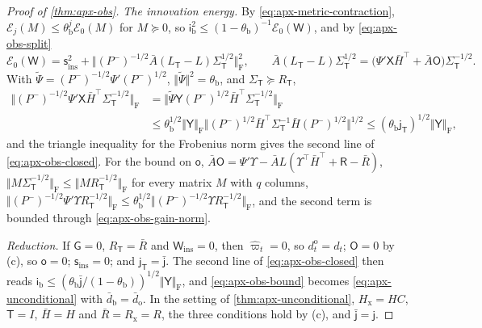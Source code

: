 \begin{proof}[Proof of \cref{thm:apx-obs}]
\emph{The innovation energy.} By \cref{eq:apx-metric-contraction}, $\mathcal E_j(M)\le\theta_{\mathrm b}^j\mathcal E_0(M)$ for $M\succeq0$, so $\mathsf i_{\mathrm b}^2\le(1-\theta_{\mathrm b})^{-1}\mathcal E_0(\mathsf W)$, and by \eqref{eq:apx-obs-split}
\begin{equation*}
\mathcal E_0(\mathsf W)=\mathsf s_{\mathrm{ins}}^2+\bigl\Vert(P^-)^{-1/2}\bar A(L_{\mathsf T}-L)\Sigma_{\mathsf T}^{1/2}\bigr\Vert_{\mathrm F}^2,\qquad\bar A(L_{\mathsf T}-L)\Sigma_{\mathsf T}^{1/2}=\bigl(\Psi'\mathsf X\bar H^\top+\bar A\mathsf O\bigr)\Sigma_{\mathsf T}^{-1/2} .
\end{equation*}
With $\tilde\Psi=(P^-)^{-1/2}\Psi'(P^-)^{1/2}$, $\Vert\tilde\Psi\Vert^2=\theta_{\mathrm b}$, and $\Sigma_{\mathsf T}\succeq R_{\mathsf T}$,
\begin{equation*}
\begin{aligned}
\bigl\Vert(P^-)^{-1/2}\Psi'\mathsf X\bar H^\top\Sigma_{\mathsf T}^{-1/2}\bigr\Vert_{\mathrm F}&=\bigl\Vert\tilde\Psi\mathsf Y(P^-)^{1/2}\bar H^\top\Sigma_{\mathsf T}^{-1/2}\bigr\Vert_{\mathrm F}\\
&\le\theta_{\mathrm b}^{1/2}\Vert\mathsf Y\Vert_{\mathrm F}\bigl\Vert(P^-)^{1/2}\bar H^\top\Sigma_{\mathsf T}^{-1}\bar H(P^-)^{1/2}\bigr\Vert^{1/2}\le(\theta_{\mathrm b}\mathsf j_{\mathsf T})^{1/2}\Vert\mathsf Y\Vert_{\mathrm F} ,
\end{aligned}
\end{equation*}
and the triangle inequality for the Frobenius norm gives the second line of \eqref{eq:apx-obs-closed}. For the bound on $\mathsf o$, $\bar A\mathsf O=\Psi'\Upsilon-\bar AL(\Upsilon^\top\bar H^\top+\mathsf R-\bar R)$, $\Vert M\Sigma_{\mathsf T}^{-1/2}\Vert_{\mathrm F}\le\Vert MR_{\mathsf T}^{-1/2}\Vert_{\mathrm F}$ for every matrix $M$ with $q$ columns, $\Vert(P^-)^{-1/2}\Psi'\Upsilon R_{\mathsf T}^{-1/2}\Vert_{\mathrm F}\le\theta_{\mathrm b}^{1/2}\Vert(P^-)^{-1/2}\Upsilon R_{\mathsf T}^{-1/2}\Vert_{\mathrm F}$, and the second term is bounded through \eqref{eq:apx-obs-gain-norm}.

\emph{Reduction.} If $\mathsf G=0$, $R_{\mathsf T}=\bar R$ and $\mathsf W_{\mathrm{ins}}=0$, then $\hat\varpi_t=0$, so $d^{\mathrm o}_t=d_t$; $\mathsf O=0$ by (c), so $\mathsf o=0$; $\mathsf s_{\mathrm{ins}}=0$; and $\mathsf j_{\mathsf T}=\bar{\mathsf j}$. The second line of \eqref{eq:apx-obs-closed} then reads $\mathsf i_{\mathrm b}\le(\theta_{\mathrm b}\bar{\mathsf j}/(1-\theta_{\mathrm b}))^{1/2}\Vert\mathsf Y\Vert_{\mathrm F}$, and \eqref{eq:apx-obs-bound} becomes \cref{eq:apx-unconditional} with $\bar d_{\mathrm b}=\bar d_{\mathrm o}$. In the setting of \cref{thm:apx-unconditional}, $H_{\mathrm x}=HC$, $\mathsf T=I$, $\bar H=H$ and $\bar R=R_{\mathrm x}=R$, the three conditions hold by (c), and $\bar{\mathsf j}=\mathsf j$.


\end{proof}

